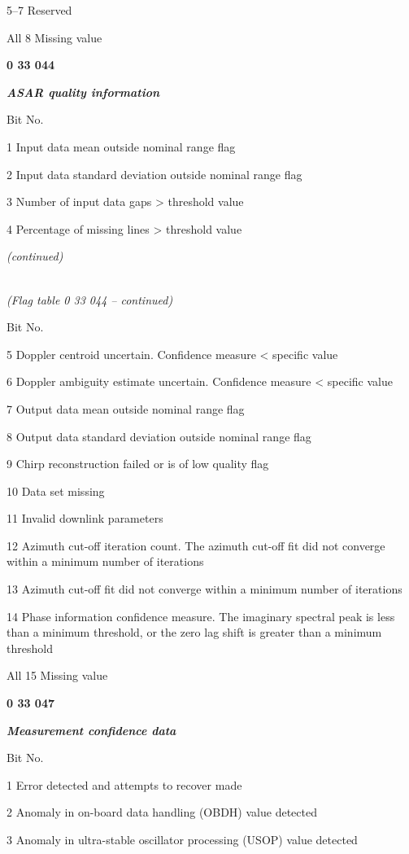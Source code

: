 5--7 Reserved

All 8 Missing value

\textbf{0 33 044}

\emph{\textbf{ASAR quality information}}

Bit No.

1 Input data mean outside nominal range flag

2 Input data standard deviation outside nominal range flag

3 Number of input data gaps \textgreater{} threshold value

4 Percentage of missing lines \textgreater{} threshold value

\emph{(continued)}

\emph{\\
(Flag table 0 33 044 -- continued)}

Bit No.

5 Doppler centroid uncertain. Confidence measure \textless{} specific value

6 Doppler ambiguity estimate uncertain. Confidence measure \textless{} specific value

7 Output data mean outside nominal range flag

8 Output data standard deviation outside nominal range flag

9 Chirp reconstruction failed or is of low quality flag

10 Data set missing

11 Invalid downlink parameters

12 Azimuth cut-off iteration count. The azimuth cut-off fit did not converge within a minimum number of iterations

13 Azimuth cut-off fit did not converge within a minimum number of iterations

14 Phase information confidence measure. The imaginary spectral peak is less than a minimum threshold, or the zero lag shift is greater than a minimum threshold

All 15 Missing value

\textbf{0 33 047}

\emph{\textbf{Measurement confidence data}}

Bit No.

1 Error detected and attempts to recover made

2 Anomaly in on-board data handling (OBDH) value detected

3 Anomaly in ultra-stable oscillator processing (USOP) value detected


